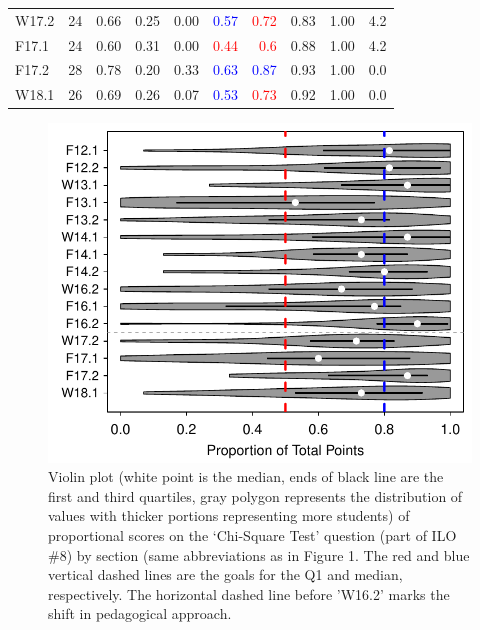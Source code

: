 \documentclass{article}\usepackage[]{graphicx}\usepackage[]{color}
\newenvironment{knitrout}{}{} %
\begin{document}
\begin{table}[h]
\begin{tabular}{lrrrrrrrrr}
  W17.2 & 24 & 0.66 & 0.25 & 0.00 & \textcolor{red}{\textcolor{blue}{0.57}} & \textcolor{red}{                   0.72} & 0.83 & 1.00 & 4.2 \\ 
  F17.1 & 24 & 0.60 & 0.31 & 0.00 & \textcolor{red}{                   0.44} & \textcolor{red}{                    0.6} & 0.88 & 1.00 & 4.2 \\ 
  F17.2 & 28 & 0.78 & 0.20 & 0.33 & \textcolor{red}{\textcolor{blue}{0.63}} & \textcolor{red}{\textcolor{blue}{0.87}} & 0.93 & 1.00 & 0.0 \\ 
  W18.1 & 26 & 0.69 & 0.26 & 0.07 & \textcolor{red}{\textcolor{blue}{0.53}} & \textcolor{red}{                   0.73} & 0.92 & 1.00 & 0.0 \\ 
   \hline
\end{tabular}
\end{table}


\begin{knitrout}
\color{fgcolor}\begin{figure}[h]

{\centering \includegraphics[width=.6\linewidth]{Figs/ChiBar-1} 

}

\caption[Violin plot (white point is the median, ends of black line are the first and third quartiles, gray polygon represents the distribution of values with thicker portions representing more students) of proportional scores on the `Chi-Square Test' question (part of ILO \#8) by section (same abbreviations as in Figure 1]{Violin plot (white point is the median, ends of black line are the first and third quartiles, gray polygon represents the distribution of values with thicker portions representing more students) of proportional scores on the `Chi-Square Test' question (part of ILO \#8) by section (same abbreviations as in Figure 1. The red and blue vertical dashed lines are the goals for the Q1 and median, respectively. The horizontal dashed line before 'W16.2' marks the shift in pedagogical approach.}\label{fig:ChiBar}
\end{figure}


\end{knitrout}
\end{document}
